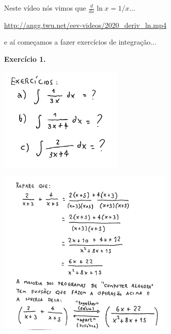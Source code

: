 \documentclass[oneside,12pt]{article}
\begin{document}
\newpage


Neste vídeo nós vimos que $\frac{d}{dx} \ln x = 1/x$...

\ssk

\url{http://angg.twu.net/eev-videos/2020_deriv_ln.mp4}

\ssk

e aí começamos a fazer exercícios de integração...

\bsk

{\bf Exercício 1.}

\includegraphics[height=5cm]{2020-1-C2/20201112_C2_fracoes_parciais_1.pdf}

\newpage

\includegraphics[height=8cm]{2020-1-C2/20201112_C2_fracoes_parciais_2.pdf}
\end{document}
